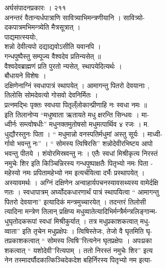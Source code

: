 \documentclass[11pt, openany]{book}
\begin{document}
{{{{{{{{{{{{{{{{{{{{{{{{{{{{{{{{{{{{{{{{{{{{{{{{{{{{{{{{{{{{{{{{{{{{{{{{{{{{{{{{{{{{{{{{{{{{{{{{{{{{{{{{{{{{{{{{{{{{{{{{{{{ अर्घसंपादनप्रकारः । २११}{\\
अनन्तरं वैतान्यर्धपात्राणि सावित्र्याभिमन्त्रणीयानि । सावित्र्यो-\\
दकपात्रमभिमन्त्र्येति मैत्रसूत्रात् ।\\
पाद्यमात्स्ययोः,\\
शन्नो देवीत्यपो दद्याद्यवोऽसीति यवानपि ।\\
गन्धपुष्पैस्तु सम्पूज्य वैश्वदेव प्रतिन्यसेत् ॥\\
वैश्वदेवब्राह्मणं प्रति पुरतो न्यसेत्, स्थापयेदित्यर्थः ।\\
बौधायने विशेषः ।\\
दक्षिणेनाग्निं स्वधापात्रं स्थापयेत् । आमागन्तु पितरो देवयानाः ,\\
तिलोसि सोमदेवत्यो गोसवो देवनिर्मितः ।\\
प्रत्नमद्भिः पृक्तः स्वधया पितृल्ँलोकान्प्रीणाहि नः स्वधा नमः ॥\\
इति तिलानोप्य ``मधुष्वाता ऋतायते मधु क्षरन्ति सिन्धवः । मा-\\
ध्वीर्नः सम्त्वोषधीः'' मधुनक्तमुतोषसो मधुमत्पार्थिव }{४ }{रजः । म.\\
धुद्यौरस्तुनः पिता । `` मधुमान्नो वनस्पतिर्मधुमां अस्तु सूर्यः ।
माध्वी-\\
र्गावो भवन्तु नः'' । `` सोमस्य त्विषिरसि'' शन्नोदेवीरभिष्टय आपो\\
भवन्तु पीतये । शंयोरमिस्रवन्तु नः । एतैः स्वधां मिश्रीकृत्य
निरस्तं\\
नमुचेः शिर इति किञ्चिन्निरस्य गन्धपुष्पाक्षतैः पितृभ्यो नमः पिता -\\
महेस्यो नमः प्रपितामहेभ्यो नम इत्यर्चयित्वा दर्भैः प्रस्थापयेत् ।\\
अस्यावमर्थः । अग्निं दक्षिणेन अन्वाहार्यपचनस्यावसथ्यस्य वामेर्दक्षि\\
णतः । स्वधापात्रम् अर्घ्योदकधारणार्थं पात्रं स्थापयित्वा `` आमागन्तु\\
पितरो देवयाना'' इत्यादिकं मन्त्रमुच्चारयेत् । तदन्तरं तिलोसी\\
त्यादिना मन्त्रेण तिलान् प्रक्षिप्य
मधुव्वातेत्यादिभिर्मन्त्रैर्मन्त्रलिङ्गान्म-\\
धुघृतोदकरूपां स्वधां मिश्रीकुर्यात् । तत्र मधुप्रकाशकत्वात् मधु-\\
व्वाता'' इति तृचेन मधुप्रक्षेपः । त्विषिस्तेजः, तेजो वै घृतमिति घृ-\\
तप्रकाशकत्वात् `` सोमस्य त्विषि''रित्यनेन घृतप्रक्षेपः । अपःप्रका\\
शकत्वात् `` यशोदेवी''रित्यपाम् । ततो निरस्तं नमुचेः शिर'' इत्य\\
नेन तस्मादर्घौदकात्किञ्चिदेकदेश बहिर्निरस्य पितृभ्यो नम इत्या-\\
}}}}}}}}}}}}}}}}}}}}}}}}}}}}}}}}}}}}}}}}}}}}}}}}}}}}}}}}}}}}}}}}}}}}}}}}}}}}}}}}}}}}}}}}}}}}}}}}}}}}}}}}}}}}}}}}}}}}}}}}}}}
\end{document}
